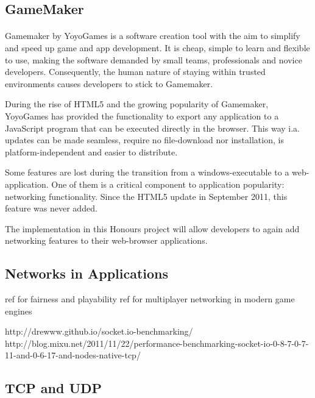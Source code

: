 \documentclass[bsc,frontabs,twoside,singlespacing,parskip,deptreport]{infthesis}     %
\begin{document}
\subsection{GameMaker}
\paragraph{}Gamemaker by YoyoGames is a software creation tool with the aim to simplify and speed up game and app development. It is cheap, simple to learn and flexible to use, making the software demanded by small teams, professionals and novice developers. Consequently, the human nature of staying within trusted environments causes developers to stick to Gamemaker.

During the rise of HTML5 and the growing popularity of Gamemaker, YoyoGames has provided the functionality to export any application to a JavaScript program that can be executed directly in the browser. This way i.a. updates can be made seamless, require no file-download nor installation, is platform-independent and easier to distribute.

Some features are lost during the transition from a windows-executable to a web-application. One of them is a critical component to application popularity: networking functionality. Since the HTML5 update in September 2011, this feature was never added.

The implementation in this Honours project will allow developers to again add networking features to their web-browser applications.

\subsection{Networks in Applications}
ref for fairness and playability \cite{Fairness_and_Playability}
ref for multiplayer networking in modern game engines \cite{Multiplayer_Networking_modern_engine}

http://drewww.github.io/socket.io-benchmarking/
\\http://blog.mixu.net/2011/11/22/performance-benchmarking-socket-io-0-8-7-0-7-11-and-0-6-17-and-nodes-native-tcp/
\subsection{TCP and UDP}
\end{document}
